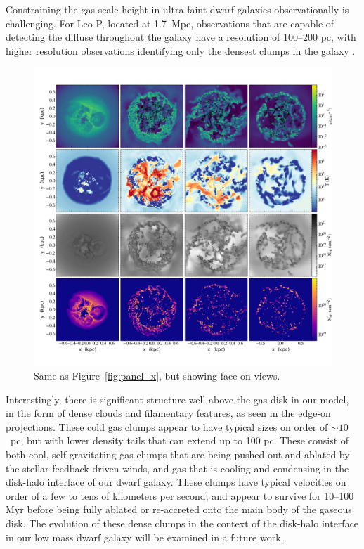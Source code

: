 \documentclass[twocolumn]{aastex61}
\begin{document}
Constraining the gas scale height in ultra-faint dwarf galaxies observationally is challenging. For Leo P, located at 1.7~Mpc,  observations that are capable of detecting the diffuse  throughout the galaxy have a resolution of 100--200 pc, with higher resolution observations identifying only the densest  clumps in the galaxy \citep[e.g.][]{Bernstein-Cooper2014}.

\begin{figure}
\centering
\includegraphics[width=0.975\linewidth]{multiplot_4x4_z.png}
\caption{Same as Figure~\ref{fig:panel_x}, but showing face-on views.}
\label{fig:panel_z}
\end{figure}

Interestingly, there is significant structure well above the gas disk in our model, in the form of dense clouds and filamentary features, as seen in the edge-on projections. These cold gas clumps appear to have typical sizes on order of $\sim 10$~pc, but with lower density tails that can extend up to 100 pc. These consist of both cool, self-gravitating gas clumps that are being pushed out and ablated by the stellar feedback driven winds, and gas that is cooling and condensing in the disk-halo interface of our dwarf galaxy. These clumps have typical velocities on order of a few to tens of kilometers per second, and appear to survive for 10--100 Myr before being fully ablated or re-accreted onto the main body of the gaseous disk. The evolution of these dense clumps in the context of the disk-halo interface in our low mass dwarf galaxy will be examined in a future work. 
\end{document}
